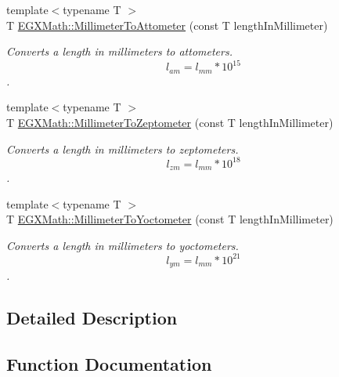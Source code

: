 \begin{DoxyCompactItemize}
{\footnotesize template$<$typename T $>$ }\\T \mbox{\hyperlink{group___e_g_x_math-_conversions-_length_conversions-_s_i-_millimeter-_s_i_ga4403d88c0af8819b1d6e70057a1457b3}{E\+G\+X\+Math\+::\+Millimeter\+To\+Attometer}} (const T length\+In\+Millimeter)
\begin{DoxyCompactList}\small\item\em Converts a length in millimeters to attometers. \[ l_{am}=l_{mm} * 10^{15} \]. \end{DoxyCompactList}\item 
{\footnotesize template$<$typename T $>$ }\\T \mbox{\hyperlink{group___e_g_x_math-_conversions-_length_conversions-_s_i-_millimeter-_s_i_ga7973ce559c88b84035d9653e26e4464c}{E\+G\+X\+Math\+::\+Millimeter\+To\+Zeptometer}} (const T length\+In\+Millimeter)
\begin{DoxyCompactList}\small\item\em Converts a length in millimeters to zeptometers. \[ l_{zm}=l_{mm} * 10^{18} \]. \end{DoxyCompactList}\item 
{\footnotesize template$<$typename T $>$ }\\T \mbox{\hyperlink{group___e_g_x_math-_conversions-_length_conversions-_s_i-_millimeter-_s_i_ga7f8020bb633d6ed2cd874a8c66d2893d}{E\+G\+X\+Math\+::\+Millimeter\+To\+Yoctometer}} (const T length\+In\+Millimeter)
\begin{DoxyCompactList}\small\item\em Converts a length in millimeters to yoctometers. \[ l_{ym}=l_{mm} * 10^{21} \]. \end{DoxyCompactList}\end{DoxyCompactItemize}


\subsection{Detailed Description}


\subsection{Function Documentation}
\mbox{\label{group___e_g_x_math-_conversions-_length_conversions-_s_i-_millimeter-_s_i_ga4403d88c0af8819b1d6e70057a1457b3}} 
